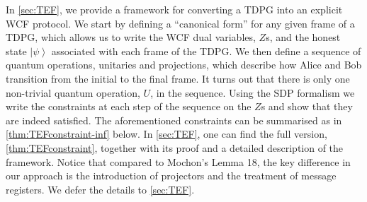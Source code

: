 \documentclass{article}
\begin{document}
In \cref{sec:TEF}, we provide a framework for converting a TDPG into an explicit WCF
protocol. We start by defining a ``canonical form'' for any given
frame of a TDPG, which
allows us to write the WCF dual variables,
$Z$s, and the honest state $\left|\psi\right\rangle $ associated
with each frame of the TDPG. We then define a sequence of quantum operations,
unitaries and projections, which describe how Alice and Bob transition
from the initial to the final frame. It turns out that there
is only one non-trivial quantum operation, $U$, in the sequence. Using the SDP
formalism we write the constraints at each step of the sequence on
the $Z$s and show that they are indeed satisfied. The aforementioned constraints can be summarised as in \cref{thm:TEFconstraint-inf} below. In \cref{sec:TEF}, one can find the full version, \cref{thm:TEFconstraint}, together with its proof and a detailed description of the framework. { Notice that compared to Mochon's Lemma 18, the key difference in our approach is the introduction of projectors and the treatment of message registers. We defer the details to \cref{sec:TEF}.}
%
\end{document}
